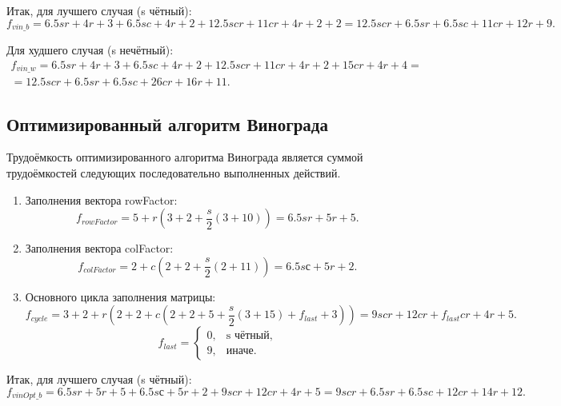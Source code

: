 \documentclass[12pt]{report}
\begin{document}
Итак, для лучшего случая (s чётный): 
\begin{equation}
f_{vin\_b} = 6.5sr + 4r + 3 + 6.5sc + 4r + 2 + 12.5scr + 11cr + 4r + 2 + 2 = 12.5scr + 6.5sr + 6.5sc + 11cr + 12r + 9.
\end{equation}

Для худшего случая (s нечётный): 
\begin{eqnarray}
f_{vin\_w} = 6.5sr + 4r + 3 + 6.5sc + 4r + 2 + 12.5scr + 11cr + 4r + 2 + 15cr + 4r + 4 =\\ = 12.5scr + 6.5sr + 6.5sc + 26cr + 16r + 11.
\end{eqnarray}

\subsection{Оптимизированный алгоритм Винограда}

Трудоёмкость оптимизированного алгоритма Винограда является суммой трудоёмкостей следующих последовательно выполненных действий.
\begin{enumerate}
	\item Заполнения вектора rowFactor:
	\begin{equation}
	f_{rowFactor} = 5 + r(3 + 2 + \frac{s}{2}(3 + 10)) = 6.5sr + 5r + 5.
	\end{equation}
	
	\item Заполнения вектора colFactor:
	\begin{equation}
	f_{colFactor} = 2 + c(2 + 2 + \frac{s}{2}(2 + 11)) = 6.5sс + 5r + 2.
	\end{equation}
	
	\item Основного цикла заполнения матрицы:
	\begin{equation}
	f_{cycle} = 3 + 2 + r(2 + 2 + c(2 + 2 + 5 + \frac{s}{2}(3 + 15) + f_{last} + 3)) = 9scr + 12cr + f_{last}cr + 4r + 5.
	\end{equation}
	\begin{equation}
	f_{last} = \begin{cases}
	0, & \text{s чётный,}\\
	9, & \text{иначе.}
	\end{cases}
	\end{equation}
\end{enumerate}

Итак, для лучшего случая (s чётный): 
\begin{equation}
f_{vinOpt\_b} = 6.5sr + 5r + 5 + 6.5sс + 5r + 2 + 9scr + 12cr + 4r + 5 = 9scr + 6.5sr + 6.5sc + 12cr + 14r + 12.
\end{equation}
\end{document}
